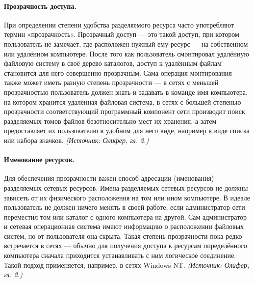 \documentclass[a4paper,12pt]{article}
\begin{document}
\paragraph{Прозрачность доступа.}
При определении степени удобства разделяемого ресурса часто употребляют термин «прозрачность». Прозрачный доступ — это такой доступ, при котором пользователь не замечает, где расположен нужный ему ресурс — на собственном или удалённом компьютере. После того как пользователь смонтировал удалённую файловую систему в своё дерево каталогов, доступ к удалённым файлам становится для него совершенно прозрачным. Сама операция монтирования также может иметь разную степень прозрачности — в сетях с меньшей прозрачностью пользователь должен знать и задавать в команде имя компьютера, на котором хранится удалённая файловая система, в сетях с большей степенью прозрачности соответствующий программный компонент сети производит поиск разделяемых томов файлов безотносительно мест их хранения, а затем предоставляет их пользователю в удобном для него виде, например в виде списка или набора значков.
\textit{(Источник: Олифер, гл. 2.)}

\paragraph{Именование ресурсов.}
Для обеспечения прозрачности важен способ адресации (именования) разделяемых сетевых ресурсов. Имена разделяемых сетевых ресурсов не должны зависеть от их физического расположения на том или ином компьютере. В идеале пользователь не должен ничего менять в своей работе, если администратор сети переместил том или каталог с одного компьютера на другой. Сам администратор и сетевая операционная система имеют информацию о расположении файловых систем, но от пользователя она скрыта. Такая степень прозрачности пока редко встречается в сетях — обычно для получения доступа к ресурсам определённого компьютера сначала приходится устанавливать с ним логическое соединение. Такой подход применяется, например, в сетях Windows NT.
\textit{(Источник: Олифер, гл. 2.)}
\end{document}
